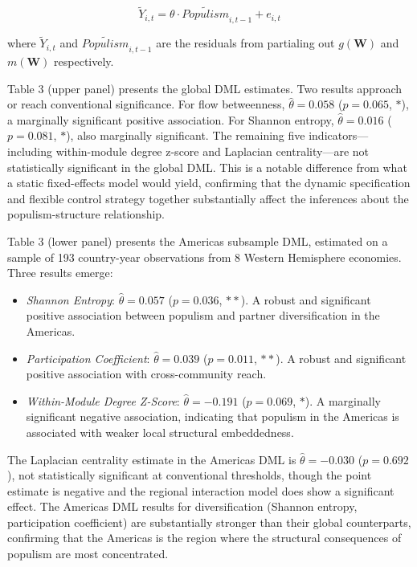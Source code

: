 \documentclass[12pt]{article}
\begin{document}
\begin{equation}
\tilde{Y}_{i,t} = \theta \cdot \tilde{Populism}_{i,t-1} + e_{i,t}
\end{equation}

where $\tilde{Y}_{i,t}$ and $\tilde{Populism}_{i,t-1}$ are the residuals from partialing out $g(\mathbf{W})$ and $m(\mathbf{W})$ respectively.

Table 3 (upper panel) presents the global DML estimates. Two results approach or reach conventional significance. For flow betweenness, $\hat{\theta} = 0.058$ ($p = 0.065$, $*$), a marginally significant positive association. For Shannon entropy, $\hat{\theta} = 0.016$ ($p = 0.081$, $*$), also marginally significant. The remaining five indicators---including within-module degree z-score and Laplacian centrality---are not statistically significant in the global DML. This is a notable difference from what a static fixed-effects model would yield, confirming that the dynamic specification and flexible control strategy together substantially affect the inferences about the populism-structure relationship.

Table 3 (lower panel) presents the Americas subsample DML, estimated on a sample of 193 country-year observations from 8 Western Hemisphere economies. Three results emerge:

\begin{itemize}
  \item \textit{Shannon Entropy}: $\hat{\theta} = 0.057$ ($p = 0.036$, $**$). A robust and significant positive association between populism and partner diversification in the Americas.
  \item \textit{Participation Coefficient}: $\hat{\theta} = 0.039$ ($p = 0.011$, $**$). A robust and significant positive association with cross-community reach.
  \item \textit{Within-Module Degree Z-Score}: $\hat{\theta} = -0.191$ ($p = 0.069$, $*$). A marginally significant negative association, indicating that populism in the Americas is associated with weaker local structural embeddedness.
\end{itemize}

The Laplacian centrality estimate in the Americas DML is $\hat{\theta} = -0.030$ ($p = 0.692$), not statistically significant at conventional thresholds, though the point estimate is negative and the regional interaction model does show a significant effect. The Americas DML results for diversification (Shannon entropy, participation coefficient) are substantially stronger than their global counterparts, confirming that the Americas is the region where the structural consequences of populism are most concentrated.
\end{document}
